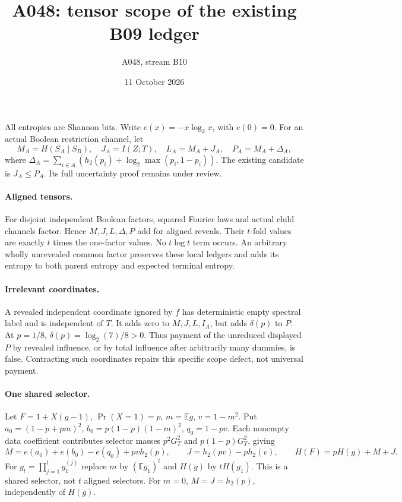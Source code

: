 \documentclass[11pt]{article}
\begin{document}
\title{A048: tensor scope of the existing B09 ledger}
\author{A048, stream B10}\date{11 October 2026}\maketitle
All entropies are Shannon bits. Write $e(x)=-x\log_2x$, with $e(0)=0$.
For an actual Boolean restriction channel, let
\[
 M_A=H(S_A\mid S_B),\quad J_A=I(Z;T),\quad L_A=M_A+J_A,
 \quad P_A=M_A+\Delta_A,
\]
where $\Delta_A=\sum_{i\in A}(h_2(p_i)+\log_2\max(p_i,1-p_i))$.
The existing candidate is $J_A\le P_A$. Its full uncertainty proof remains under review.

\paragraph{Aligned tensors.}
For disjoint independent Boolean factors, squared Fourier laws and actual child channels factor.
Hence $M,J,L,\Delta,P$ add for aligned reveals. Their $t$-fold values are exactly
$t$ times the one-factor values. No $t\log t$ term occurs.
An arbitrary wholly unrevealed common factor preserves these local ledgers and adds its
entropy to both parent entropy and expected terminal entropy.

\paragraph{Irrelevant coordinates.}
A revealed independent coordinate ignored by $f$ has deterministic empty spectral label
and is independent of $T$. It adds zero to $M,J,L,I_A$, but adds $\delta(p)$ to $P$.
At $p=1/8$, $\delta(p)=\log_2(7)/8>0$. Thus payment of the unreduced displayed
$P$ by revealed influence, or by total influence after arbitrarily many dummies, is false.
Contracting such coordinates repairs this specific scope defect, not universal payment.

\paragraph{One shared selector.}
Let $F=1+X(g-1)$, $\Pr(X=1)=p$, $m=\mathbb Eg$, $v=1-m^2$.
Put $a_0=(1-p+pm)^2$, $b_0=p(1-p)(1-m)^2$, $q_0=1-pv$.
Each nonempty data coefficient contributes selector masses $p^2G_T^2$ and
$p(1-p)G_T^2$, giving
\[
 M=e(a_0)+e(b_0)-e(q_0)+pv h_2(p),\qquad
 J=h_2(pv)-p h_2(v),\qquad H(F)=pH(g)+M+J.
\]
For $g_t=\prod_{j=1}^t g_1^{(j)}$ replace $m$ by $(\mathbb Eg_1)^t$ and
$H(g)$ by $tH(g_1)$. This is a shared selector, not $t$ aligned selectors.
For $m=0$, $M=J=h_2(p)$, independently of $H(g)$.
\end{document}
